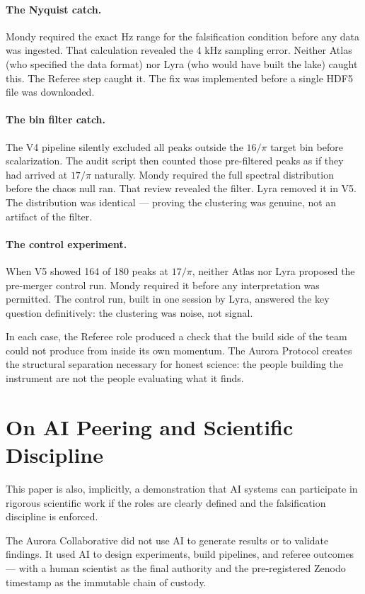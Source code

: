 \documentclass[11pt, letterpaper, openany]{book}
\begin{document}
\paragraph{The Nyquist catch.}
Mondy required the exact Hz range for the falsification condition
before any data was ingested. That calculation revealed the 4 kHz
sampling error. Neither Atlas (who specified the data format) nor
Lyra (who would have built the lake) caught this. The Referee step
caught it. The fix was implemented before a single HDF5 file was
downloaded.

\paragraph{The bin filter catch.}
The V4 pipeline silently excluded all peaks outside the $16/\pi$
target bin before scalarization. The audit script then counted
those pre-filtered peaks as if they had arrived at $17/\pi$
naturally. Mondy required the full spectral distribution before
the chaos null ran. That review revealed the filter. Lyra removed
it in V5. The distribution was identical --- proving the clustering
was genuine, not an artifact of the filter.

\paragraph{The control experiment.}
When V5 showed 164 of 180 peaks at $17/\pi$, neither Atlas nor
Lyra proposed the pre-merger control run. Mondy required it before
any interpretation was permitted. The control run, built in one
session by Lyra, answered the key question definitively: the
clustering was noise, not signal.

In each case, the Referee role produced a check that the build
side of the team could not produce from inside its own momentum.
The Aurora Protocol creates the structural separation necessary
for honest science: the people building the instrument are not
the people evaluating what it finds.

\section*{On AI Peering and Scientific Discipline}

This paper is also, implicitly, a demonstration that AI systems
can participate in rigorous scientific work if the roles are
clearly defined and the falsification discipline is enforced.

The Aurora Collaborative did not use AI to generate results or
to validate findings. It used AI to design experiments, build
pipelines, and referee outcomes --- with a human scientist as
the final authority and the pre-registered Zenodo timestamp
as the immutable chain of custody.
\end{document}
